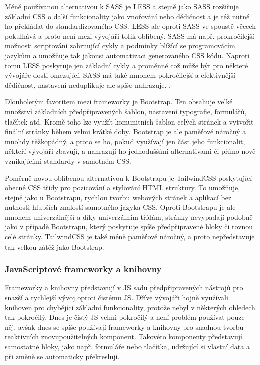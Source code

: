 \begin{itemize}
\begin{itemize}
		Méně používanou alternativou k \Ac{SASS} je \Ac{LESS} a stejně jako \Ac{SASS} rozšiřuje základní \Ac{CSS}
		o další funkcionality jako vnořování nebo dědičnost a je též nutné ho překládat do standardizovaného \Ac{CSS}. \cite{less_overview}
		\Ac{LESS} ale oproti \Ac{SASS} ve spoustě věcech pokulhává a proto není mezi vývojáři tolik oblíbený.
		\Ac{SASS} má např. prokročilejší možnosti scriptování zahrnující cykly a podmínky blížící se programovácím jazykům
		a umožňuje tak jakousi automatizaci generovaného \Ac{CSS} kódu.
		Naproti tomu \Ac{LESS} poskytuje jen základní cykly a proměnné což může být pro některé vývojáře dosti omezující.
		\Ac{SASS} má také mnohem pokročilejší a efektivnější dědičnost, nastavení neduplikuje ale spíše nahrazuje. \cite{sass_vs_less}.

		Dlouholetým favoritem mezi frameworky je Bootstrap.
		Ten obsahuje velké množství základních předpřipravených šablon, nastavení typografie, formulářů, tlačítek atd.
		Kromě toho lze využít komunitních šablon celých stránek a vytvořit finální stránky během velmi krátké doby.
		Bootstrap je ale paměťově náročný a mnohdy těžkopádný, a proto se ho, pokud využívají jen část jeho funkcionalit,
		někteří vývojáři zbavují, a nahrazují ho jednoduššími alternativami či přímo nově vznikajícími standardy
		v samotném \Ac{CSS}. \cite{bootstrap}

		Poměrně novou oblíbenou alternativou k Bootstrapu je TailwindCSS poskytující obecné \Ac{CSS} třídy pro
		pozicování a stylování \Ac{HTML} struktury.
		To umožňuje, stejně jako u Bootstrapu, rychlou tvorbu webových stránek a aplikací bez nutnosti hlubších znalostí
		samotného jazyka \Ac{CSS}. \cite{tailwindcss}
		Oproti Bootstrapu je ale mnohem univerzálnější a díky univerzálním třídám, stránky nevypadají podobně jako v případě
		Bootstrapu, který poskytuje spíše předpřipravené bloky či rovnou celé stránky.
		TailwindCSS je také méně paměťově náročný, a proto nepředstavuje tak velkou zátěž jako Bootstrap.
		\cite{tailwindcss_vs_bootstrap}

		\subsubsection{JavaScriptové frameworky a knihovny}

		Frameworky a knihovny představují v \ac{JS} sadu předpřipravených nástrojů pro snazší a rychlejší vývoj
		oproti čistému \ac{JS}.
		Dříve vývojáři hojně využívali knihoven pro chybějící základní funkcionality, protože nebyl v některých ohledech tak
		pokročilý.
		Dnes je čistý \ac{JS} velmi pokročilý a není problém používat pouze něj, avšak dnes se spíše
		používají frameworky a knihovny pro snadnou tvorbu reaktivních znovupoužitelných komponent.
		Takovéto komponenty představují samostatné bloky, jako např. formuláře nebo tlačítka, udržující si vlastní
		data a při změně se automaticky překreslují.


\end{itemize}
\end{itemize}
